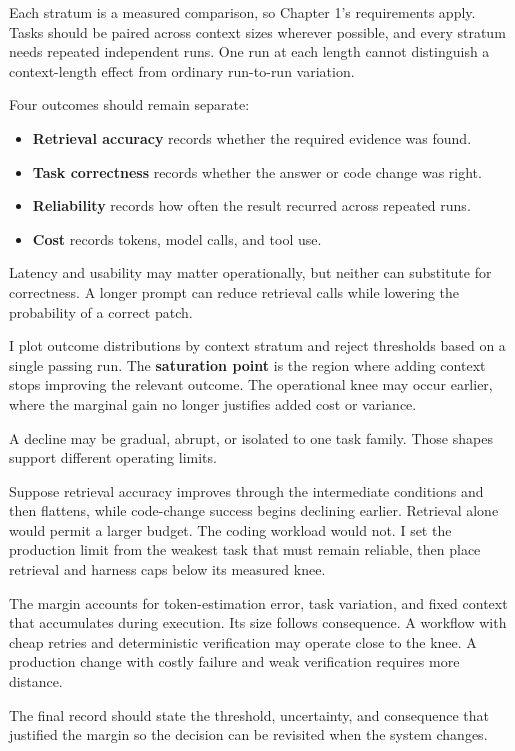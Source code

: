 Each stratum is a measured comparison, so Chapter 1's requirements apply. Tasks should be paired across context sizes wherever possible, and every stratum needs repeated independent runs. One run at each length cannot distinguish a context-length effect from ordinary run-to-run variation.

Four outcomes should remain separate:

\begin{itemize}
\tightlist
\item
  \textbf{Retrieval accuracy} records whether the required evidence was found.
\item
  \textbf{Task correctness} records whether the answer or code change was right.
\item
  \textbf{Reliability} records how often the result recurred across repeated runs.
\item
  \textbf{Cost} records tokens, model calls, and tool use.
\end{itemize}

Latency and usability may matter operationally, but neither can substitute for correctness. A longer prompt can reduce retrieval calls while lowering the probability of a correct patch.

I plot outcome distributions by context stratum and reject thresholds based on a single passing run. The \textbf{saturation point} is the region where adding context stops improving the relevant outcome. The operational knee may occur earlier, where the marginal gain no longer justifies added cost or variance.

A decline may be gradual, abrupt, or isolated to one task family. Those shapes support different operating limits.

Suppose retrieval accuracy improves through the intermediate conditions and then flattens, while code-change success begins declining earlier. Retrieval alone would permit a larger budget. The coding workload would not. I set the production limit from the weakest task that must remain reliable, then place retrieval and harness caps below its measured knee.

The margin accounts for token-estimation error, task variation, and fixed context that accumulates during execution. Its size follows consequence. A workflow with cheap retries and deterministic verification may operate close to the knee. A production change with costly failure and weak verification requires more distance.

The final record should state the threshold, uncertainty, and consequence that justified the margin so the decision can be revisited when the system changes.

